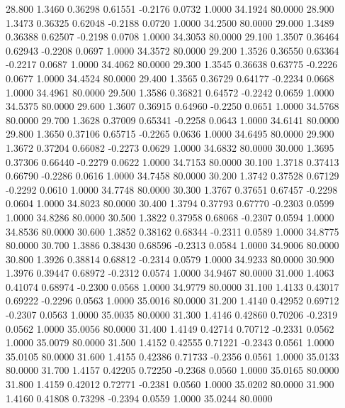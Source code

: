   28.800   1.3460   0.36298   0.61551  -0.2176   0.0732   1.0000  34.1924  80.0000
  28.900   1.3473   0.36325   0.62048  -0.2188   0.0720   1.0000  34.2500  80.0000
  29.000   1.3489   0.36388   0.62507  -0.2198   0.0708   1.0000  34.3053  80.0000
  29.100   1.3507   0.36464   0.62943  -0.2208   0.0697   1.0000  34.3572  80.0000
  29.200   1.3526   0.36550   0.63364  -0.2217   0.0687   1.0000  34.4062  80.0000
  29.300   1.3545   0.36638   0.63775  -0.2226   0.0677   1.0000  34.4524  80.0000
  29.400   1.3565   0.36729   0.64177  -0.2234   0.0668   1.0000  34.4961  80.0000
  29.500   1.3586   0.36821   0.64572  -0.2242   0.0659   1.0000  34.5375  80.0000
  29.600   1.3607   0.36915   0.64960  -0.2250   0.0651   1.0000  34.5768  80.0000
  29.700   1.3628   0.37009   0.65341  -0.2258   0.0643   1.0000  34.6141  80.0000
  29.800   1.3650   0.37106   0.65715  -0.2265   0.0636   1.0000  34.6495  80.0000
  29.900   1.3672   0.37204   0.66082  -0.2273   0.0629   1.0000  34.6832  80.0000
  30.000   1.3695   0.37306   0.66440  -0.2279   0.0622   1.0000  34.7153  80.0000
  30.100   1.3718   0.37413   0.66790  -0.2286   0.0616   1.0000  34.7458  80.0000
  30.200   1.3742   0.37528   0.67129  -0.2292   0.0610   1.0000  34.7748  80.0000
  30.300   1.3767   0.37651   0.67457  -0.2298   0.0604   1.0000  34.8023  80.0000
  30.400   1.3794   0.37793   0.67770  -0.2303   0.0599   1.0000  34.8286  80.0000
  30.500   1.3822   0.37958   0.68068  -0.2307   0.0594   1.0000  34.8536  80.0000
  30.600   1.3852   0.38162   0.68344  -0.2311   0.0589   1.0000  34.8775  80.0000
  30.700   1.3886   0.38430   0.68596  -0.2313   0.0584   1.0000  34.9006  80.0000
  30.800   1.3926   0.38814   0.68812  -0.2314   0.0579   1.0000  34.9233  80.0000
  30.900   1.3976   0.39447   0.68972  -0.2312   0.0574   1.0000  34.9467  80.0000
  31.000   1.4063   0.41074   0.68974  -0.2300   0.0568   1.0000  34.9779  80.0000
  31.100   1.4133   0.43017   0.69222  -0.2296   0.0563   1.0000  35.0016  80.0000
  31.200   1.4140   0.42952   0.69712  -0.2307   0.0563   1.0000  35.0035  80.0000
  31.300   1.4146   0.42860   0.70206  -0.2319   0.0562   1.0000  35.0056  80.0000
  31.400   1.4149   0.42714   0.70712  -0.2331   0.0562   1.0000  35.0079  80.0000
  31.500   1.4152   0.42555   0.71221  -0.2343   0.0561   1.0000  35.0105  80.0000
  31.600   1.4155   0.42386   0.71733  -0.2356   0.0561   1.0000  35.0133  80.0000
  31.700   1.4157   0.42205   0.72250  -0.2368   0.0560   1.0000  35.0165  80.0000
  31.800   1.4159   0.42012   0.72771  -0.2381   0.0560   1.0000  35.0202  80.0000
  31.900   1.4160   0.41808   0.73298  -0.2394   0.0559   1.0000  35.0244  80.0000
